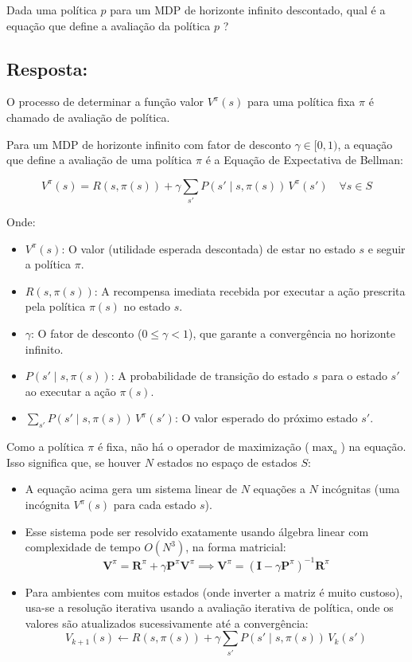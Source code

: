 \documentclass[a4paper,12pt]{article}
\begin{document}
Dada uma política $p$ para um MDP de horizonte infinito descontado, qual é a equação que define a avaliação da política $p$ ?

\subsection*{Resposta:}

\bigskip

O processo de determinar a função valor $V^\pi(s)$ para uma política fixa $\pi$ é chamado de avaliação de política.

Para um MDP de horizonte infinito com fator de desconto $\gamma \in [0, 1)$, a equação que define a avaliação de uma política $\pi$ é a Equação de Expectativa de Bellman:

$$V^\pi(s) = R(s, \pi(s)) + \gamma \sum_{s'} P(s' \mid s, \pi(s)) \, V^\pi(s') \quad \forall s \in S$$

Onde:
\begin{itemize}
	\item $V^\pi(s)$: O valor (utilidade esperada descontada) de estar no estado $s$ e seguir a política $\pi$.
	\item $R(s, \pi(s))$: A recompensa imediata recebida por executar a ação prescrita pela política $\pi(s)$ no estado $s$.
	\item $\gamma$: O fator de desconto ($0 \le \gamma < 1$), que garante a convergência no horizonte infinito.
	\item $P(s' \mid s, \pi(s))$: A probabilidade de transição do estado $s$ para o estado $s'$ ao executar a ação $\pi(s)$.
	\item $\sum_{s'} P(s' \mid s, \pi(s)) \, V^\pi(s')$: O valor esperado do próximo estado $s'$.\\
\end{itemize}


Como a política $\pi$ é fixa, não há o operador de maximização ($\max_a$) na equação. Isso significa que, se houver $N$ estados no espaço de estados $S$:

\begin{itemize}
	\item A equação acima gera um sistema linear de $N$ equações a $N$ incógnitas (uma incógnita $V^\pi(s)$ para cada estado $s$).
	\item Esse sistema pode ser resolvido exatamente usando álgebra linear com complexidade de tempo $O(N^3)$, na forma matricial:
	$$\mathbf{V}^\pi = \mathbf{R}^\pi + \gamma \mathbf{P}^\pi \mathbf{V}^\pi \implies \mathbf{V}^\pi = (\mathbf{I} - \gamma \mathbf{P}^\pi)^{-1} \mathbf{R}^\pi$$
	\item Para ambientes com muitos estados (onde inverter a matriz é muito custoso), usa-se a resolução iterativa usando a avaliação iterativa de política, onde os valores são atualizados sucessivamente até a convergência:
	$$V_{k+1}(s) \leftarrow R(s, \pi(s)) + \gamma \sum_{s'} P(s' \mid s, \pi(s)) \, V_k(s')$$
\end{itemize}
\end{document}
